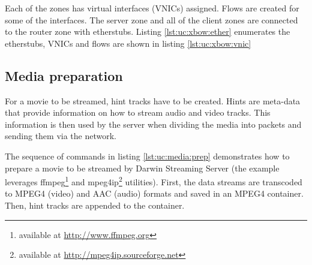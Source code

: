 \documentclass[11pt]{book}
\begin{document}
        \noindent
        \begin{minipage}{\textwidth}
          
        \end{minipage}

        Each of the zones has virtual interfaces (VNICs) assigned. Flows are created for some of the interfaces. The
        server zone and all of the client zones are connected to the router zone with etherstubs. Listing
        \ref{lst:uc:xbow:ether} enumerates the etherstubs, VNICs and flows are shown in listing \ref{lst:uc:xbow:vnic} \\

        \noindent
        \begin{minipage}{\textwidth}
          
        \end{minipage}

        \noindent
        \begin{minipage}{\textwidth}
          
        \end{minipage}


      \subsection{Media preparation}
      \label{sub:}

        For a movie to be streamed, hint tracks have to be created. Hints are meta-data that provide information on how
        to stream audio and video tracks. This information is then used by the server when dividing the media into
        packets and sending them via the network.

        The sequence of commands in listing \ref{lst:uc:media:prep} demonstrates how to prepare a movie to be streamed
        by Darwin Streaming Server (the example leverages ffmpeg\footnote{available at \url{http://www.ffmpeg.org}} and
        mpeg4ip\footnote{available at \url{http://mpeg4ip.sourceforge.net}} utilities). First, the data streams are
        transcoded to MPEG4 (video) and AAC (audio) formats and saved in an MPEG4 container. Then, hint tracks are
        appended to the container. \\

        \noindent
        \begin{minipage}{\textwidth}
          
        \end{minipage}
\end{document}
